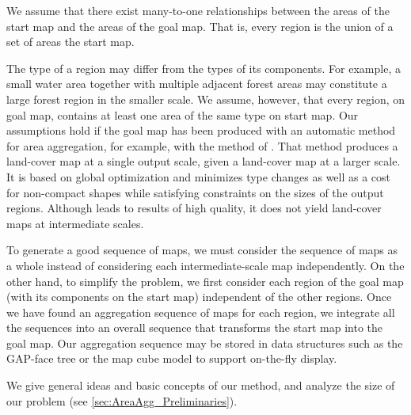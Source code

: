 We assume that there exist many-to-one relationships between the 
areas of the
start map and the areas of the goal map.
That is, every region is the union of a set of areas 
 the start map.

The type of a region may differ from the types of its 
components. 
For example, a small water area together with 
multiple adjacent forest areas may constitute 
a large forest region in the smaller scale.
We assume, however, that every region, on goal map, 
contains at least one area of the same type on start map.
Our assumptions hold if the goal map has been produced 
with an automatic method for area aggregation, 
for example, with the method of \citet{HaunertWolff2010AreaAgg}.
That method produces a land-cover map at a single output scale, 
given a land-cover map at a larger scale.
It is based on global optimization and minimizes 
type changes as well as a cost for non-compact shapes 
while satisfying constraints on the sizes of the output regions.
Although \textcite{HaunertWolff2010AreaAgg}
leads to results of high quality, 
it does not yield land-cover maps at intermediate scales.


To generate a good sequence of maps, 
we must consider the sequence of maps as a whole 
instead of considering each intermediate-scale map independently.
On the other hand, to simplify the problem,
we first consider each region of the goal map 
(with its components on the start map) 
independent of the other regions.
Once we have found an aggregation sequence of maps for each region, 
we integrate all the sequences into an overall sequence 
that transforms the start map into the goal map. 
Our aggregation sequence may be stored in data structures
such as the GAP-face tree \citep{vanOosterom2005} 
or the map cube model \citep{Timpf1998} 
to support on-the-fly display.


We give general ideas and basic concepts of our method, 
and analyze the size of our problem (see 
\sect\ref{sec:AreaAgg_Preliminaries}).

